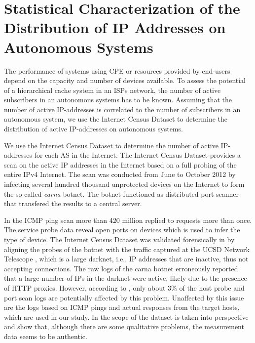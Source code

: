 \section{Statistical Characterization of the Distribution of IP Addresses on Autonomous Systems}\label{sec:aslevel:census}

The performance of systems using CPE or resources provided by end-users depend on the capacity and number of devices available.
To assess the potential of a hierarchical cache system in an ISPs network, the number of active subscribers in an autonomous systems has to be known.
Assuming that the number of active IP-addresses is correlated to the number of subscribers in an autonomous system, we use the Internet Census Dataset to determine the distribution of active IP-addresses on autonomous systems.

We use the Internet Census Dataset \cite{carna2013} to determine the number of active IP-addresses for each AS in the Internet.
The Internet Census Dataset provides a scan on the active IP addresses in the Internet based on a full probing of the entire IPv4 Internet.
The scan was conducted from June to October 2012 by infecting several hundred thousand unprotected devices on the Internet to form the so called \emph{carna} botnet.
The botnet functioned as distributed port scanner that transfered the results to a central server.

In the ICMP ping scan more than 420 million replied to requests more than once.
The service probe data reveal open ports on devices which is used to infer the type of device.
The Internet Census Dataset was validated forensically in \cite{dainotticaida} by aligning the probes of the botnet with the traffic captured at the UCSD Network Telescope \cite{ucsdtelescope}, which is a large darknet, i.e., IP addresses that are inactive, thus not accepting connections.
The raw logs of the carna botnet erroneously reported that a large number of IPs in the darknet were active, likely due to the presence of HTTP proxies.
However, according to \cite{dainotticaida}, only about 3\% of the host probe and port scan logs are potentially affected by this problem.
Unaffected by this issue are the logs based on ICMP pings and actual responses from the target hosts, which are used in our study.
In \cite{krenc2014internet} the scope of the dataset is taken into perspective and show that, although there are some qualitative problems, the measurement data seems to be authentic.

